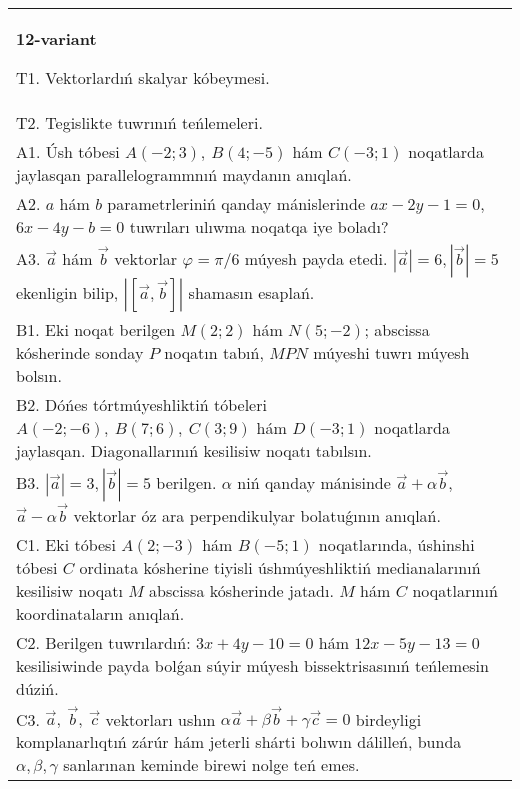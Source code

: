 \documentclass{article}
\begin{document}
\begin{tabular}{m{17cm}}
\textbf{12-variant}
\newline

T1. 
Vektorlardıń skalyar kóbeymesi.
 \\
T2. 
Tegislikte tuwrınıń teńlemeleri.
 \\
A1. 
Úsh tóbesi $A(-2;3), \ B(4;-5)$ hám
$C(-3;1)$ noqatlarda jaylasqan parallelogrammnıń maydanın anıqlań.
 \\
A2. 
$a$ hám $b$ parametrleriniń qanday mánislerinde
$ax-2y-1=0$, $6x-4y-b=0$ tuwrıları ulıwma noqatqa iye boladı?
 \\
A3. 
$\overrightarrow{a}$ hám $\overrightarrow{b}$ vektorlar
$\varphi = \pi/6$ múyesh payda etedi.
$|\overrightarrow{a}| = 6,|\overrightarrow{b}| = 5$ ekenligin bilip,
$\left| \left\lbrack \overrightarrow{a},\overrightarrow{b} \right\rbrack \right|$ shamasın esaplań. 
 \\
B1. 
Eki noqat berilgen \(M(2;2)\) hám \(N(5;-2)\); abscissa kósherinde sonday $P$ noqatın tabıń, $MPN$ múyeshi tuwrı múyesh bolsın.
 \\
B2. 
Dóńes tórtmúyeshliktiń tóbeleri
\(A(-2;-6),\ B(7;6),\ C(3;9)\) hám \(D(-3;1)\) noqatlarda
jaylasqan. Diagonallarınıń kesilisiw noqatı tabılsın.
 \\
B3. 
$|\vec{a}| = 3,|\vec{b}| = 5$ berilgen. $\alpha$ niń qanday mánisinde $\vec{a} + \alpha\vec{b}$, $\vec{a} - \alpha\vec{b}$ vektorlar óz ara perpendikulyar bolatuǵının anıqlań.
 \\
C1. 
Eki tóbesi \(A(2; - 3)\) hám \(B( - 5;1)\) noqatlarında,
úshinshi tóbesi $C$ ordinata kósherine tiyisli úshmúyeshliktiń
medianalarınıń kesilisiw noqatı $M$ abscissa kósherinde jatadı.
$M$ hám $C$ noqatlarınıń koordinataların anıqlań.
 \\
C2. 
Berilgen tuwrılardıń:
\(3x + 4y - 10 = 0\) hám \(12x - 5y - 13 = 0\) kesilisiwinde payda
bolǵan súyir múyesh bissektrisasınıń teńlemesin dúziń.
 \\
C3. 
\(\vec{a},\ \vec{b},\ \vec{c}\) vektorları ushın \(\alpha\vec{a} + \beta\vec{b} + \gamma\vec{c} = 0\) birdeyligi komplanarlıqtıń zárúr hám jeterli shárti bolıwın dálilleń, bunda \(\alpha,\beta,\gamma\) sanlarınan keminde birewi nolge teń emes. \\

\end{tabular}
\vspace{1cm}
\end{document}
